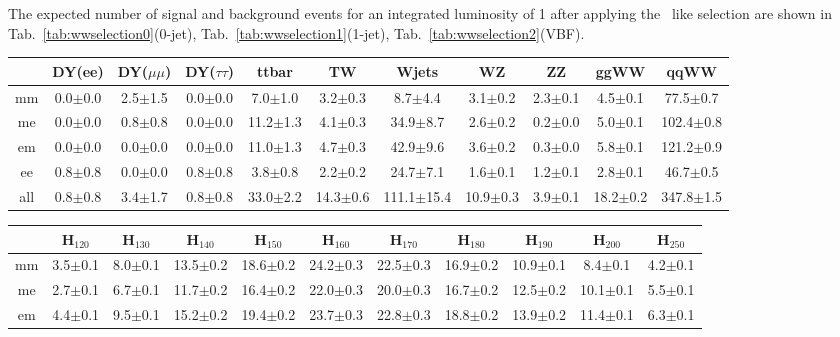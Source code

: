 The expected number of signal and background events for an integrated 
luminosity of 1\ifb{} after applying the 
\WW\ like selection are shown in Tab.~\ref{tab:wwselection0}(0-jet), Tab.~\ref{tab:wwselection1}(1-jet), Tab.~\ref{tab:wwselection2}(VBF).

\begin{table}[!ht]
  \begin{center}
 {\small
  \begin{tabular} {|c|c|c|c|c|c|c|c|c|c|c|}
\hline
  & DY(ee) & DY($\mu\mu$) & DY($\tau\tau$) & ttbar & TW & Wjets & WZ & ZZ & ggWW & qqWW \\
  \hline
  \hline
  mm &  0.0$\pm$0.0 &  2.5$\pm$1.5 &  0.0$\pm$0.0 &  7.0$\pm$1.0 &  3.2$\pm$0.3 &  8.7$\pm$4.4 &  3.1$\pm$0.2 &  2.3$\pm$0.1 &  4.5$\pm$0.1 & 77.5$\pm$0.7 \\
  me &  0.0$\pm$0.0 &  0.8$\pm$0.8 &  0.0$\pm$0.0 & 11.2$\pm$1.3 &  4.1$\pm$0.3 & 34.9$\pm$8.7 &  2.6$\pm$0.2 &  0.2$\pm$0.0 &  5.0$\pm$0.1 & 102.4$\pm$0.8 \\
  em &  0.0$\pm$0.0 &  0.0$\pm$0.0 &  0.0$\pm$0.0 & 11.0$\pm$1.3 &  4.7$\pm$0.3 & 42.9$\pm$9.6 &  3.6$\pm$0.2 &  0.3$\pm$0.0 &  5.8$\pm$0.1 & 121.2$\pm$0.9 \\
  ee &  0.8$\pm$0.8 &  0.0$\pm$0.0 &  0.8$\pm$0.8 &  3.8$\pm$0.8 &  2.2$\pm$0.2 & 24.7$\pm$7.1 &  1.6$\pm$0.1 &  1.2$\pm$0.1 &  2.8$\pm$0.1 & 46.7$\pm$0.5 \\
 \hline
 all &  0.8$\pm$0.8 &  3.4$\pm$1.7 &  0.8$\pm$0.8 & 33.0$\pm$2.2 & 14.3$\pm$0.6 & 111.1$\pm$15.4 & 10.9$\pm$0.3 &  3.9$\pm$0.1 & 18.2$\pm$0.2 & 347.8$\pm$1.5 \\
 \hline
  \end{tabular}
  }
 {\small
  \begin{tabular} {|c|c|c|c|c|c|c|c|c|c|c|}
  \hline
     &   H$_{120}$ &  H$_{130}$ &    H$_{140}$ &   H$_{150}$ &   H$_{160}$ &   H$_{170}$ &   H$_{180}$ &   H$_{190}$ &   H$_{200}$ &   H$_{250}$ \\
  \hline
  \hline
  mm &  3.5$\pm$0.1 &  8.0$\pm$0.1 & 13.5$\pm$0.2 & 18.6$\pm$0.2 & 24.2$\pm$0.3 & 22.5$\pm$0.3 & 16.9$\pm$0.2 & 10.9$\pm$0.1 &  8.4$\pm$0.1 &  4.2$\pm$0.1 \\
  me &  2.7$\pm$0.1 &  6.7$\pm$0.1 & 11.7$\pm$0.2 & 16.4$\pm$0.2 & 22.0$\pm$0.3 & 20.0$\pm$0.3 & 16.7$\pm$0.2 & 12.5$\pm$0.2 & 10.1$\pm$0.1 &  5.5$\pm$0.1 \\
  em &  4.4$\pm$0.1 &  9.5$\pm$0.1 & 15.2$\pm$0.2 & 19.4$\pm$0.2 & 23.7$\pm$0.3 & 22.8$\pm$0.3 & 18.8$\pm$0.2 & 13.9$\pm$0.2 & 11.4$\pm$0.1 &  6.3$\pm$0.1 \\

\end{tabular}}
\end{center}
\end{table}
